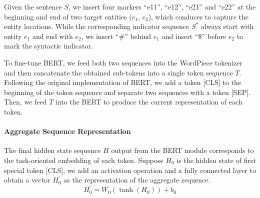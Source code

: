 \documentclass[conference]{IEEEtran}
\begin{document}
Given the sentence \begin{math} S \end{math}, we insert four markers “e11”, “e12”, “e21” and “e22” at the beginning and end of two target entities (\begin{math} e_1 \end{math}, \begin{math} e_2 \end{math}), which conduces to capture the entity locations. While the corresponding indicator sequence \begin{math} S^* \end{math} always start with entity \begin{math} e_1 \end{math} and end with \begin{math} e_2 \end{math}, we insert “\begin{math}\#\end{math}” behind \begin{math} e_1 \end{math} and insert “\begin{math}\$\end{math}” before \begin{math} e_2 \end{math} to mark the syntactic indicator. 

To fine-tune BERT, we feed both two sequences into the WordPiece tokenizer and then concatenate the obtained sub-tokens into a single token sequence \begin{math} T \end{math}. Following the original implementation of BERT, we add a token [CLS] to the beginning of the token sequence and separate two sequences with a token [SEP]. Then, we feed \begin{math} T \end{math} into the BERT to produce the current representation of each token.

\paragraph{Aggregate Sequence Representation}

The final hidden state sequence \begin{math} H \end{math} output from the BERT module corresponds to the task-oriented embedding of each token. Suppose \begin{math}H_0\end{math} is the hidden state of first special token [CLS], we add an activation operation and a fully connected layer to obtain a vector \begin{math} H_{0}^{\prime} \end{math} as the representation of the aggregate sequence.
\begin{equation}
H_{0}^{\prime}=W_{0}\left(\tanh \left(H_{0}\right)\right)+b_{0}
\end{equation}
\end{document}
